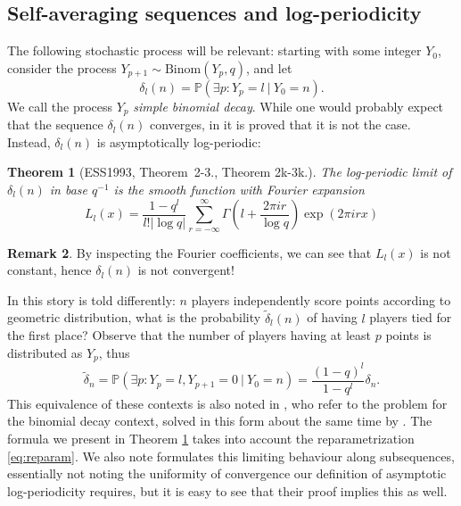 \documentclass[11pt]{article}
\newcommand{\PP}{\mathbb{P}}
\newcommand{\Binom}{\mathrm{Binom}}
\newtheorem{theorem}{Theorem}[section]
\theoremstyle{definition}
\newtheorem{megj}[theorem]{Remark}
\begin{document}
\subsection{Self-averaging sequences and log-periodicity} \label{sec:self_avg}

The following stochastic process will be relevant: starting with some integer $Y_0$, consider the process $Y_{p+1}\sim \Binom(Y_p, q)$, and let
$$\delta_l(n)=\PP(\exists p: Y_p=l\ |\ Y_0=n).$$
We call the process $Y_p$ {\it simple binomial decay}. While one would probably expect that the sequence $\delta_l(n)$ converges, in \cite{ESS1993} it is proved that it is not the case. Instead, $\delta_l(n)$ is asymptotically log-periodic:

\begin{theorem}[ESS1993, Theorem~2-3., Theorem 2k-3k.]\label{thm:self_averaging_asymptotics}
    The log-periodic limit of $\delta_l(n)$ in base $q^{-1}$ is the smooth function with Fourier expansion 
    $$L_l(x) = \frac{1-q^l}{l! |\log q|}\sum_{r=-\infty}^{\infty}\Gamma\left(l+\frac{2\pi i r}{\log q}\right)\exp (2\pi i r x)$$
\end{theorem}

\begin{megj}
    By inspecting the Fourier coefficients, we can see that $L_l(x)$ is not constant, hence $\delta_l(n)$ is not convergent!
\end{megj}

In \cite{ESS1993} this story is told differently: $n$ players independently score points according to geometric distribution, what is the probability $\widetilde{\delta}_l(n)$ of having $l$ players tied for the first place? Observe that the number of players having at least $p$ points is distributed as $Y_p$, thus
\begin{equation}\label{eq:reparam}
\widetilde{\delta}_n = \PP(\exists p: Y_p=l, Y_{p+1}=0\ |\ Y_0=n) = \frac{(1-q)^l}{1-q^l}\delta_n.
\end{equation}
This equivalence of these contexts is also noted in \cite{ESS1993}, who refer to the problem \cite{Rade} for the binomial decay context, solved in this form about the same time by \cite{Mann}. The formula we present in Theorem \ref{thm:self_averaging_asymptotics} takes into account the reparametrization \eqref{eq:reparam}. We also note \cite{ESS1993} formulates this limiting behaviour along subsequences, essentially not noting the uniformity of convergence our definition of asymptotic log-periodicity requires, but it is easy to see that their proof implies this as well.
\end{document}
